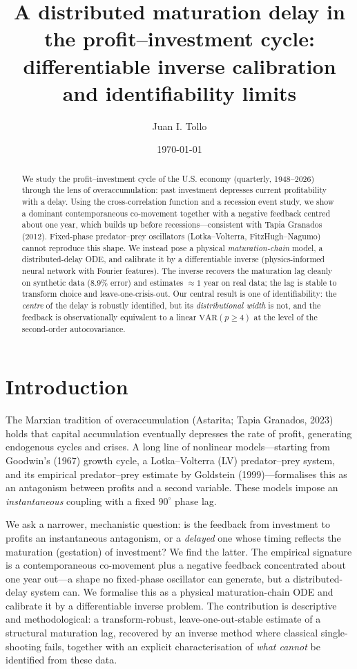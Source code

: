 \documentclass[11pt]{article}
\title{\vspace{-1.2cm}A distributed maturation delay in the profit--investment cycle:\\
differentiable inverse calibration and identifiability limits}
\author{Juan I. Tollo}
\date{\today}
\begin{document}
\maketitle
\vspace{-0.7cm}

\begin{abstract}
\noindent
We study the profit--investment cycle of the U.S. economy (quarterly, 1948--2026) through the
lens of overaccumulation: past investment depresses current profitability with a delay. Using
the cross-correlation function and a recession event study, we show a dominant contemporaneous
co-movement together with a negative feedback centred about one year, which builds up before
recessions---consistent with Tapia Granados (2012). Fixed-phase predator--prey oscillators
(Lotka--Volterra, FitzHugh--Nagumo) cannot reproduce this shape. We instead pose a physical
\emph{maturation-chain} model, a distributed-delay ODE, and calibrate it by a differentiable
inverse (physics-informed neural network with Fourier features). The inverse recovers the
maturation lag cleanly on synthetic data ($8.9\%$ error) and estimates $\approx\!1$ year on real
data; the lag is stable to transform choice and leave-one-crisis-out. Our central result is one
of identifiability: the \emph{centre} of the delay is robustly identified, but its
\emph{distributional width} is not, and the feedback is observationally equivalent to a linear
$\mathrm{VAR}(p\!\ge\!4)$ at the level of the second-order autocovariance.
\end{abstract}

\section{Introduction}
The Marxian tradition of overaccumulation (Astarita; Tapia Granados, 2023) holds that
capital accumulation eventually depresses the rate of profit, generating endogenous cycles and
crises. A long line of nonlinear models---starting from Goodwin's (1967) growth cycle, a
Lotka--Volterra (LV) predator--prey system, and its empirical predator--prey estimate by
Goldstein (1999)---formalises this as an antagonism between profits and a second variable. These
models impose an \emph{instantaneous} coupling with a fixed $90^\circ$ phase lag.

We ask a narrower, mechanistic question: is the feedback from investment to profits an
instantaneous antagonism, or a \emph{delayed} one whose timing reflects the maturation
(gestation) of investment? We find the latter. The empirical signature is a contemporaneous
co-movement plus a negative feedback concentrated about one year out---a shape no fixed-phase
oscillator can generate, but a distributed-delay system can. We formalise this as a physical
maturation-chain ODE and calibrate it by a differentiable inverse problem. The contribution is
descriptive and methodological: a transform-robust, leave-one-out-stable estimate of a
structural maturation lag, recovered by an inverse method where classical single-shooting fails,
together with an explicit characterisation of \emph{what cannot} be identified from these data.
\end{document}
